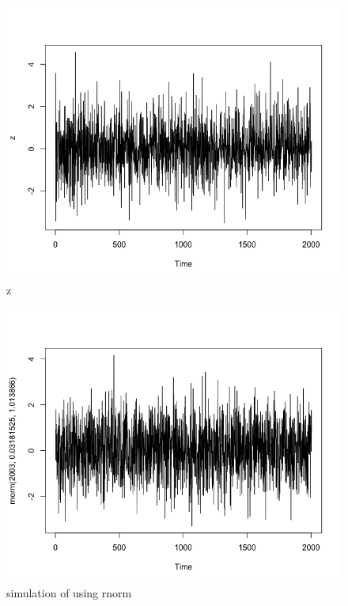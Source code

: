 \documentclass[a4paper,11pt]{article}
\begin{document}
\begin{figure}[H]
\centering
\caption{z}
\includegraphics[scale=.40]{z.png}
\end{figure}

\begin{figure}[H]
\centering
\caption{simulation of using rnorm}
\includegraphics[scale=.40]{rnorm.png}
\end{figure}
\end{document}
